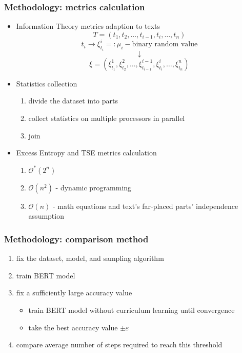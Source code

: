 \documentclass{beamer}
\begin{document}
\begin{frame}
	\frametitle{Methodology: metrics calculation}
	\begin{itemize}
		\item Information Theory metrics adaption to texts
			\[
			T=(t_1, t_2, \ldots, t_{i-1},t_i,\ldots, t_n)
			\]
			\[
			t_i\rightarrow \xi^i_{t_i} =: \mu_i - \text{binary random value}
			\]
			\[
			\downarrow
			\]
			\[
			\xi=(\xi^1_{t_1},\xi^2_{t_2},\ldots,\xi^{i-1}_{t_{i-1}},\xi^i_{t_i},\ldots,\xi^n_{t_n})
			\]
		\item Statistics collection
			\begin{enumerate}
				\item divide the dataset into parts
				\item collect statistics on multiple processors in parallel
				\item join
			\end{enumerate}
		\item Excess Entropy and TSE metrics calculation
			\begin{enumerate}
				\item $\mathcal{O^*}(2^n)$
				\item $\mathcal{O}(n^2)$ - dynamic programming
				\item $\mathcal{O}(n)$ - math equations and text’s far-placed parts’ independence assumption
			\end{enumerate}
	\end{itemize}
\end{frame}

\begin{frame}
	\frametitle{Methodology: comparison method}
	\begin{enumerate}
		\item fix the dataset, model, and sampling algorithm
		\item train BERT model
		\item fix a sufficiently large accuracy value
			\begin{itemize}
				\item train BERT model without curriculum learning until convergence
				\item take the best accuracy value $\pm \varepsilon$
			\end{itemize}
		\item compare average number of steps required to reach this threshold
	\end{enumerate}
\end{frame}
\end{document}
